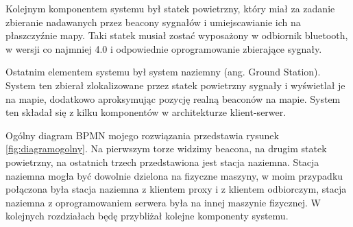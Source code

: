 Kolejnym komponentem systemu był statek powietrzny, który miał za zadanie zbieranie nadawanych przez beacony sygnałów i umiejscawianie ich na płaszczyźnie mapy. Taki statek musiał zostać wyposażony w odbiornik bluetooth, w wersji co najmniej 4.0 i odpowiednie oprogramowanie zbierające sygnały.

Ostatnim elementem systemu był system naziemny (ang. Ground Station). System ten zbierał zlokalizowane przez statek powietrzny sygnały i wyświetlał je na mapie, dodatkowo aproksymując pozycję realną beaconów na mapie. System ten składał się z kilku komponentów w architekturze klient-serwer.

Ogólny diagram BPMN mojego rozwiązania przedstawia rysunek \ref{fig:diagramogolny}. Na pierwszym torze widzimy beacona, na drugim statek powietrzny, na ostatnich trzech przedstawiona jest stacja naziemna. Stacja naziemna mogła być dowolnie dzielona na fizyczne maszyny, w moim przypadku połączona była stacja naziemna z klientem proxy i z klientem odbiorczym, stacja naziemna z oprogramowaniem serwera była na innej maszynie fizycznej. W kolejnych rozdziałach będę przybliżał kolejne komponenty systemu.

